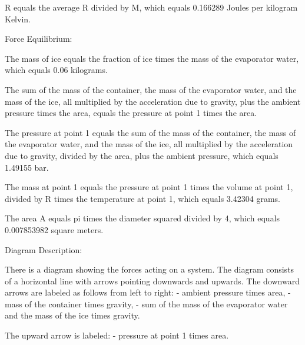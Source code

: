 R equals the average R divided by M, which equals 0.166289 Joules per kilogram Kelvin.

Force Equilibrium:

The mass of ice equals the fraction of ice times the mass of the evaporator water, which equals 0.06 kilograms.

The sum of the mass of the container, the mass of the evaporator water, and the mass of the ice, all multiplied by the acceleration due to gravity, plus the ambient pressure times the area, equals the pressure at point 1 times the area.

The pressure at point 1 equals the sum of the mass of the container, the mass of the evaporator water, and the mass of the ice, all multiplied by the acceleration due to gravity, divided by the area, plus the ambient pressure, which equals 1.49155 bar.

The mass at point 1 equals the pressure at point 1 times the volume at point 1, divided by R times the temperature at point 1, which equals 3.42304 grams.

The area A equals pi times the diameter squared divided by 4, which equals 0.007853982 square meters.

Diagram Description:

There is a diagram showing the forces acting on a system. The diagram consists of a horizontal line with arrows pointing downwards and upwards. The downward arrows are labeled as follows from left to right:
- ambient pressure times area,
- mass of the container times gravity,
- sum of the mass of the evaporator water and the mass of the ice times gravity.

The upward arrow is labeled:
- pressure at point 1 times area.